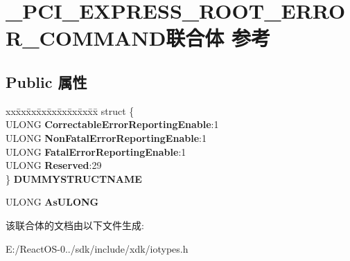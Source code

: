 \hypertarget{union___p_c_i___e_x_p_r_e_s_s___r_o_o_t___e_r_r_o_r___c_o_m_m_a_n_d}{}\section{\+\_\+\+P\+C\+I\+\_\+\+E\+X\+P\+R\+E\+S\+S\+\_\+\+R\+O\+O\+T\+\_\+\+E\+R\+R\+O\+R\+\_\+\+C\+O\+M\+M\+A\+N\+D联合体 参考}
\label{union___p_c_i___e_x_p_r_e_s_s___r_o_o_t___e_r_r_o_r___c_o_m_m_a_n_d}
\subsection*{Public 属性}
\begin{DoxyCompactItemize}
\item 
\mbox{\label{union___p_c_i___e_x_p_r_e_s_s___r_o_o_t___e_r_r_o_r___c_o_m_m_a_n_d_a764c8ac8c44afccc91933d7db806d2bc}} 
\begin{tabbing}
xx\=xx\=xx\=xx\=xx\=xx\=xx\=xx\=xx\=\kill
struct \{\\
\>ULONG {\bfseries CorrectableErrorReportingEnable}:1\\
\>ULONG {\bfseries NonFatalErrorReportingEnable}:1\\
\>ULONG {\bfseries FatalErrorReportingEnable}:1\\
\>ULONG {\bfseries Reserved}:29\\
\} {\bfseries DUMMYSTRUCTNAME}\\

\end{tabbing}\item 
\mbox{\label{union___p_c_i___e_x_p_r_e_s_s___r_o_o_t___e_r_r_o_r___c_o_m_m_a_n_d_a5e9a88e67b212c714983ef4a0ee3b8ce}} 
U\+L\+O\+NG {\bfseries As\+U\+L\+O\+NG}
\end{DoxyCompactItemize}


该联合体的文档由以下文件生成\+:\begin{DoxyCompactItemize}
\item 
E\+:/\+React\+O\+S-\/0../sdk/include/xdk/iotypes.\+h\end{DoxyCompactItemize}
